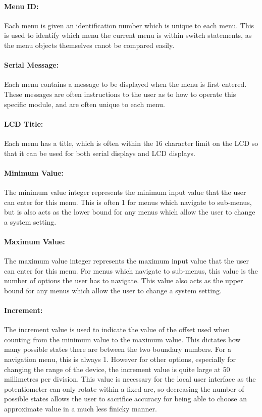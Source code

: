 \documentclass[]{report}
\begin{document}
\paragraph{Menu ID:}
Each menu is given an identification number which is unique to each menu. This is used to identify which menu the current menu is within switch statements, as the menu objects themselves canot be compared easily.

\paragraph{Serial Message:}
Each menu contains a message to be displayed when the menu is first entered. These messages are often instructions to the user as to how to operate this specific module, and are often unique to each menu.

\paragraph{LCD Title:}
Each menu has a title, which is often within the 16 character limit on the LCD so that it can be used for both serial displays and LCD displays.

\paragraph{Minimum Value:}
The minimum value integer represents the minimum input value that the user can enter for this menu. This is often 1 for menus which navigate to sub-menus, but is also acts as the lower bound for any menus which allow the user to change a system setting.

\paragraph{Maximum Value:}
The maximum value integer represents the maximum input value that the user can enter for this menu. For menus which navigate to sub-menus, this value is the number of options the user has to navigate. This value also acts as the upper bound for any menus which allow the user to change a system setting.

\paragraph{Increment:}
The increment value is used to indicate the value of the offset used when counting from the minimum value to the maximum value. This dictates how many possible states there are between the two boundary numbers. For a navigation menu, this is always 1. However for other options, especially for changing the range of the device, the increment value is quite large at 50 millimetres per division. This value is necessary for the local user interface as the potentiometer can only rotate within a fixed arc, so decreasing the number of possible states allows the user to sacrifice accuracy for being able to choose an approximate value in a much less finicky manner.
\end{document}
